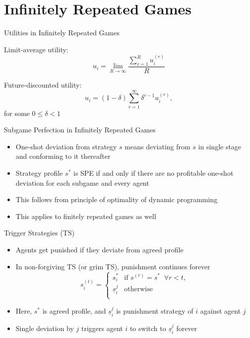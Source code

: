 \documentclass[11pt,aspectratio=169,handout]{beamer}
\begin{document}
 \section{Infinitely Repeated Games}
 
  \begin{frame}{Utilities in Infinitely Repeated Games}
   \begin{itemizes}[2em]
    \item \alert{Limit-average utility}: 
    $$u_i = \lim_{R\rightarrow\infty}\frac{\sum_{r=1}^{R}u_i^{(r)}}{R}$$
    \item \alert{Future-discounted utility}: 
    $$u_i = (1 - \delta) \sum_{r=1}^{\infty}\delta^{r-1} u_i^{(r)},$$
    for some $0 \le \delta < 1$
   \end{itemizes}
  \end{frame}
  
  
  \begin{frame}{Subgame Perfection in Infinitely Repeated Games}
   \begin{itemize}
   \setlength{\itemsep}{2em}
    \item \alert{One-shot deviation} from strategy $s$ means deviating from $s$ in single stage and conforming to it thereafter
    \item Strategy profile $s^*$ is SPE \alert{if and only if} there are no \alert{profitable} one-shot deviation for \alert{each subgame} and \alert{every agent}
    \item This follows from principle of optimality of \alert{dynamic programming}
    \item This applies to finitely repeated games as well
   \end{itemize}
  \end{frame}

  \begin{frame}{Trigger Strategies (TS)}
   \begin{itemize}
    \item Agents get \alert{punished} if they deviate from agreed profile
    \item In \alert{non-forgiving} TS (or grim TS), punishment continues forever
    $$ 
    s_i^{(t)}=\begin{cases}
                  s_i^* &\text{if } s^{(r)} = s^* \;\; \forall r<t,\\
                  \underline{s}_{i}^{j} &\text{otherwise}\\
                 \end{cases}
    $$
    \item Here, $s^{*}$ is agreed profile, and $\underline{s}_{i}^{j}$ is punishment strategy of $i$ against agent $j$
    \item Single deviation by $j$ triggers agent $i$ to switch to $\underline{s}_{i}^{j}$ \alert{forever}
   \end{itemize}
  \end{frame}
\end{document}
